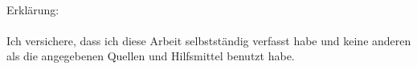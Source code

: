\begin{titlepage}
    \ 
\end{titlepage}

\begin{titlepage}
    Erklärung: \\
    \\
    Ich versichere, dass ich diese Arbeit selbstständig verfasst habe und keine anderen als die 
    angegebenen Quellen und Hilfsmittel benutzt habe.
\end{titlepage}

